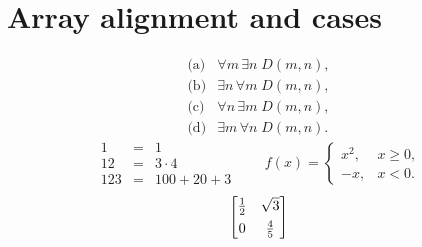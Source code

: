 \documentclass[11pt]{article}
\begin{document}
\pagestyle{empty}
\section*{Array alignment and cases}
\[
\begin{array}{ll}
\text{(a)} & \forall m\,\exists n\;D(m,n),\\[2pt]
\text{(b)} & \exists n\,\forall m\;D(m,n),\\[2pt]
\text{(c)} & \forall n\,\exists m\;D(m,n),\\[2pt]
\text{(d)} & \exists m\,\forall n\;D(m,n).
\end{array}
\]
\[
\begin{array}{l|cr}
1 & = & 1\\
12 & = & 3\cdot4\\[5pt]
123 & = & 100+20+3
\end{array}
\qquad
f(x)=\begin{cases}
x^2, & x\geq0,\\[3pt]
-x, & x<0.
\end{cases}
\]
\[
\left[\begin{array}{@{}cc@{}}
\frac{1}{2} & \sqrt{3}\\[4pt]
0 & \frac{4}{5}
\end{array}\right]
\]
\end{document}
